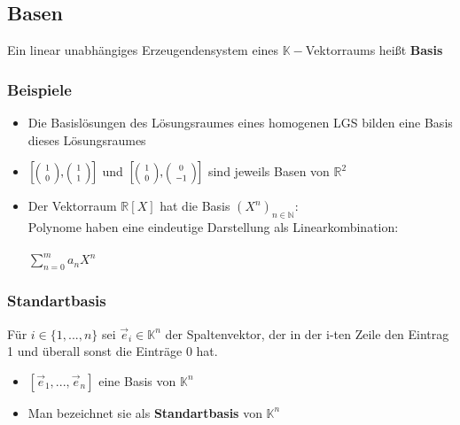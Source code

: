 \documentclass[titlepage]{article}
\newcommand{\K}{\mathbb{K}}
\newcommand{\N}{\mathbb{N}}
\newcommand{\R}{\mathbb{R}}
\newcommand{\1}{\mathbb{1}}
\newcommand{\0}{\mathbb{0}}
\begin{document}
			\subsection{Basen}
				Ein linear unabhängiges Erzeugendensystem eines $\K-$Vektorraums heißt \textbf{Basis}
				\subsubsection{Beispiele}
					\begin{itemize}
						\item Die Basislösungen des Lösungsraumes eines homogenen LGS bilden eine Basis dieses Lösungsraumes
						\item $\left[\scalebox{0.7}{$\left(\begin{array}{c}1\\0\end{array}\right)$},\scalebox{0.7}{$\left(\begin{array}{c}1\\1\end{array}\right)$}\right]$ und $\left[\scalebox{0.7}{$\left(\begin{array}{c}1\\0\end{array}\right)$},\scalebox{0.7}{$\left(\begin{array}{c}0\\-1\end{array}\right)$}\right]$ sind jeweils Basen von $\R^2$
						\item Der Vektorraum $\R[X]$ hat die Basis $(X^n)_{n\in\N}$: \\Polynome haben eine eindeutige Darstellung als Linearkombination:\\\\
						$\sum\limits^m_{n=0}a_nX^n$
					\end{itemize}
				\subsubsection{Standartbasis}
					Für $i\in\{1,...,n\}$ sei $\vec{e}_i\in\K^n$ der Spaltenvektor, der in der i-ten Zeile den Eintrag 1 und überall sonst die Einträge 0 hat.
					\begin{itemize}
						\item $[\vec{e}_1,...,\vec{e}_n]$ eine Basis von $\K^n$
						\item Man bezeichnet sie als \textbf{Standartbasis} von $\K^n$
					\end{itemize}
\end{document}
